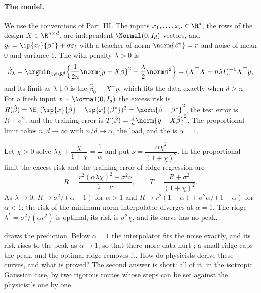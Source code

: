 \begin{refsection}
\paragraph{The model.} We use the conventions of Part~III. The inputs $x_1,\dots,x_n\in\R^d$, the rows of the design $X\in\R^{n\times d}$, are independent $\Normal(0,I_d)$ vectors, and $y_i=\ip{x_i}{\beta^*}+\sigma\varepsilon_i$ with a teacher of norm $\norm{\beta^*}=r$ and noise of mean $0$ and variance $1$. The  with penalty $\lambda>0$ is
\begin{equation}\label{eq:ridge:estimator}
\hat\beta_\lambda=\argmin_{\beta\in\R^d}\Bigl\{\frac1{2n}\norm{y-X\beta}^2+\frac\lambda2\norm\beta^2\Bigr\}=(X^\top X+n\lambda I)^{-1}X^\top y,
\end{equation}
and its limit as $\lambda\downarrow0$ is the  $\hat\beta_0=X^+y$, which fits the data exactly when $d\ge n$. For a fresh input $x\sim\Normal(0,I_d)$ the excess risk is $R(\hat\beta)=\E_x(\ip{x}{\hat\beta}-\ip{x}{\beta^*})^2=\norm{\hat\beta-\beta^*}^2$, the test error is $R+\sigma^2$, and the training error is $T(\hat\beta)=\frac1n\norm{y-X\hat\beta}^2$. The proportional limit takes $n,d\to\infty$ with $n/d\to\alpha$, the load, and the  is $\alpha=1$.

\begin{physicsbox}
Let $\chi>0$ solve $\lambda\chi+\dfrac{\chi}{1+\chi}=\dfrac1\alpha$ and put $\nu=\dfrac{\alpha\chi^2}{(1+\chi)^2}$. In the proportional limit the excess risk and the training error of ridge regression are
\[
R=\frac{r^2(\alpha\lambda\chi)^2+\sigma^2\nu}{1-\nu},\qquad T=\frac{R+\sigma^2}{(1+\chi)^2}.
\]
As $\lambda\to0$, $R\to\sigma^2/(\alpha-1)$ for $\alpha>1$ and $R\to r^2(1-\alpha)+\sigma^2\alpha/(1-\alpha)$ for $\alpha<1$: the risk of the minimum-norm interpolator diverges at $\alpha=1$. The ridge $\lambda^*=\sigma^2/(\alpha r^2)$ is optimal, its risk is $\sigma^2\chi$, and its curve has no peak.
\end{physicsbox}

 draws the prediction. Below $\alpha=1$ the interpolator fits the noise exactly, and its risk rises to the peak as $\alpha\to1$, so that there more data hurt \parencite{Nakkiran2019}; a small ridge caps the peak, and the optimal ridge removes it. How do physicists derive these curves, and what is proved? The second answer is short: all of it, in the isotropic Gaussian case, by two rigorous routes whose steps can be set against the physicist's one by one.


\end{refsection}

